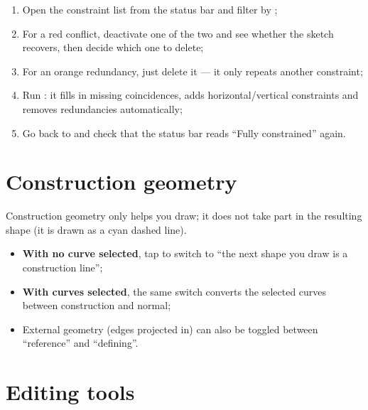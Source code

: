\begin{practice}
\begin{enumerate}
  \item Open the constraint list from the status bar and filter by ;
  \item For a red conflict, deactivate one of the two and see whether the sketch recovers, then decide which one to delete;
  \item For an orange redundancy, just delete it --- it only repeats another constraint;
  \item Run : it fills in missing coincidences, adds horizontal/vertical constraints and removes
        redundancies automatically;
  \item Go back to  and check that the status bar reads ``Fully constrained'' again.
\end{enumerate}
\end{practice}

\section{Construction geometry}

Construction geometry only helps you draw; it does not take part in the resulting shape (it is drawn as a cyan dashed
line).

\begin{itemize}
  \item \textbf{With no curve selected}, tap  to switch to ``the next shape you draw is a
        construction line'';
  \item \textbf{With curves selected}, the same switch converts the selected curves between construction and normal;
  \item External geometry (edges projected in) can also be toggled between ``reference'' and ``defining''.
\end{itemize}

\section{Editing tools}

